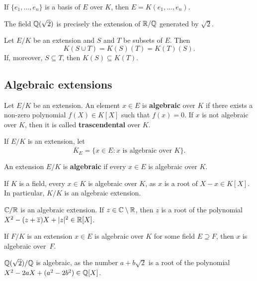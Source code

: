 \begin{example}
	If $\{e_1,\dots,e_n\}$ is a basis of $E$ over $K$, 
	then $E=K(e_1,\dots,e_n)$. 
\end{example}

\begin{example}
	The field $\mathbb{Q}(\sqrt{2})$ is precisely the extension 
	of $\mathbb{R}/\mathbb{Q}$ generated by $\sqrt{2}$. 
\end{example}

Let $E/K$ be an extension and $S$ and $T$ be subsets of $E$.
Then 
\[
	K(S\cup T)=K(S)(T)=K(T)(S).
\]
If, moreover, 
$S\subseteq T$, then $K(S)\subseteq K(T)$. 

\subsection{Algebraic extensions}

\begin{definition}
	Let $E/K$ be an extension. An element $x\in E$
	is \textbf{algebraic} over $K$ if there
	exists a non-zero polynomial 
	$f(X)\in K[X]$ such that $f(x)=0$. If $x$ is
	not algebraic over $K$, 
	then it is called \textbf{trascendental} over $K$.
\end{definition}

If $E/K$ is an extension, let 
\[
	\overline{K}_E=\{x\in E:x\text{ is algebraic over }K\}. 
\]

\begin{definition}	
	An extension $E/K$ is \textbf{algebraic} if 
	every $x\in E$ is algebraic over $K$. 
\end{definition}

If $K$ is a field, every $x\in K$ is algebraic over $K$,
as $x$ is a root of $X-x\in K[X]$. In particular, $K/K$ is
an algebraic extension. 

\begin{example}
	$\mathbb{C}/\mathbb{R}$ is an algebraic extension. If $z\in\mathbb{C}\setminus\mathbb{R}$, then
	$z$ is a root of the polynomial 
	$X^2-(z+\overline{z})X+|z|^2\in\mathbb{R}[X]$. 
\end{example}

If $F/K$ is an extension $x\in E$ is algebraic
over $K$ for some field $E\supseteq F$, 
then $x$ is algebraic over~$F$. 

\begin{example}
	$\mathbb{Q}(\sqrt{2})/\mathbb{Q}$ is algebraic, as the number
	$a+b\sqrt{2}$ is a root of the polynomial
	$X^2-2aX+(a^2-2b^2)\in\mathbb{Q}[X]$. 
\end{example}

